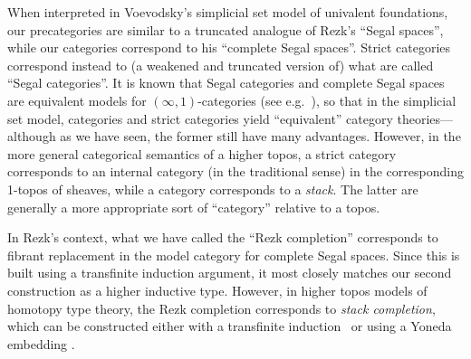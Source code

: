\documentclass[12pt]{article}
\begin{document}
When interpreted in Voevodsky's simplicial set model of univalent foundations, our precategories are similar to a truncated analogue of Rezk's ``Segal spaces'', while our categories correspond to his ``complete Segal spaces''.
%
Strict categories correspond instead to (a weakened and truncated version of) what are called ``Segal categories''.
It is known that Segal categories and complete Segal spaces are equivalent models for $(\infty,1)$-categories (see e.g.~\cite{bergner:infty-one}), so that in the simplicial set model, categories and strict categories yield ``equivalent'' category theories---although as we have seen, the former still have many advantages.
However, in the more general categorical semantics of a higher topos,
%
a strict category corresponds to an internal category (in the traditional sense) in the corresponding 1-topos of sheaves, while a category corresponds to a \emph{stack}.
%
The latter are generally a more appropriate sort of ``category'' relative to a topos.

In Rezk's context, what we have called the ``Rezk completion'' corresponds to fibrant replacement
in the model category for complete Segal spaces.
Since this is built using a transfinite induction argument, it most closely matches our second construction as a higher inductive type.
However, in higher topos models of homotopy type theory, the Rezk completion corresponds to \emph{stack completion}, which can be constructed either with a transfinite induction~\cite{jt:strong-stacks} or using a Yoneda embedding \cite{bunge:stacks-morita-internal}.
\end{document}
